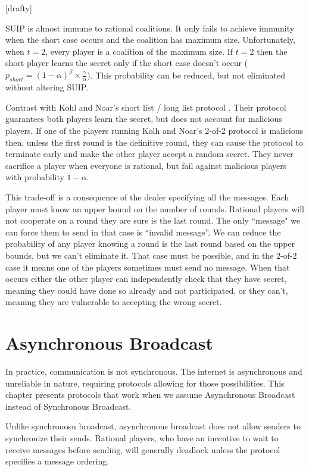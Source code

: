 \documentclass{dalcsthesis}
\begin{document}
[drafty]

SUIP is almost immune to rational coalitions. It only fails to achieve immunity when the short case occurs and the coalition has maximum size. Unfortunately, when $t=2$, every player is a coalition of the maximum size. If $t=2$ then the short player learns the secret only if the short case doesn't occur ($p_{short} = (1-\alpha)^\beta \times \frac{\gamma}{\alpha}$). This probability can be reduced, but not eliminated without altering SUIP.

Contrast with Kohl and Noar's short list / long list protocol \cite{kol08}. Their protocol guarantees both players learn the secret, but does not account for malicious players. If one of the players running Kolh and Noar's 2-of-2 protocol is malicious then, unless the first round is the definitive round, they can cause the protocol to terminate early and make the other player accept a random secret. They never sacrifice a player when everyone is rational, but fail against malicious players with probability $1-\alpha$.

This trade-off is a consequence of the dealer specifying all the messages. Each player must know an upper bound on the number of rounds. Rational players will not cooperate on a round they are sure is the last round. The only ``message" we can force them to send in that case is ``invalid message''. We can reduce the probability of any player knowing a round is the last round based on the upper bounds, but we can't eliminate it. That case must be possible, and in the 2-of-2 case it means one of the players sometimes must send no message. When that occurs either the other player can independently check that they have secret, meaning they could have done so already and not participated, or they can't, meaning they are vulnerable to accepting the wrong secret.

\chapter{Asynchronous Broadcast}

In practice, communication is not synchronous. The internet is asynchronous and unreliable in nature, requiring protocols allowing for those possibilities. This chapter presents protocols that work when we assume Asynchronous Broadcast instead of Synchronous Broadcast.

Unlike synchronosu broadcast, asynchronous broadcast does not allow senders to synchronize their sends. Rational players, who have an incentive to wait to receive messages before sending, will generally deadlock unless the protocol specifies a message ordering.
\end{document}
